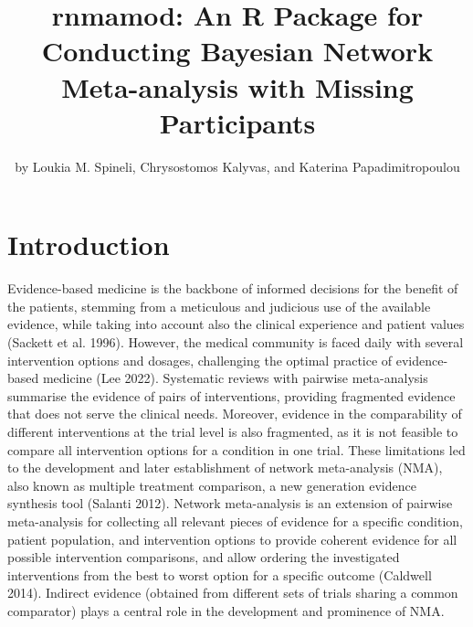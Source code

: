 \title{rnmamod: An R Package for Conducting Bayesian Network Meta-analysis with Missing Participants}
\author{by Loukia M. Spineli, Chrysostomos Kalyvas, and Katerina Papadimitropoulou}

\maketitle


\hypertarget{introduction}{%
\section{Introduction}\label{introduction}}

Evidence-based medicine is the backbone of informed decisions for the benefit of
the patients, stemming from a meticulous and judicious use of the available evidence,
while taking into account also the clinical experience and patient values (Sackett et al. 1996).
However, the medical community is faced daily with several intervention options and
dosages, challenging the optimal practice of evidence-based medicine (Lee 2022).
Systematic reviews with pairwise meta-analysis summarise the evidence of pairs of
interventions, providing fragmented evidence that does not serve the clinical needs.
Moreover, evidence in the comparability of different interventions at the trial
level is also fragmented, as it is not feasible to compare all intervention options
for a condition in one trial. These limitations led to the development and later
establishment of network meta-analysis (NMA), also known as multiple treatment
comparison, a new generation evidence synthesis tool (Salanti 2012). Network
meta-analysis is an extension of pairwise meta-analysis for collecting all relevant
pieces of evidence for a specific condition, patient population, and intervention
options to provide coherent evidence for all possible intervention comparisons,
and allow ordering the investigated interventions from the best to worst option
for a specific outcome (Caldwell 2014). Indirect evidence (obtained from different
sets of trials sharing a common comparator) plays a central role in the development
and prominence of NMA.

